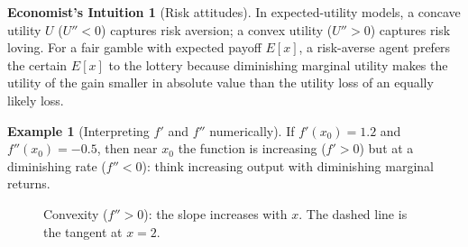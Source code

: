 \documentclass[12pt]{article}
\theoremstyle{definition}
\newtheorem{example}{Example}
\newtheorem{remark}{Economist's Intuition}
\begin{document}
\begin{remark}[Risk attitudes]
In expected-utility models, a concave utility $U$ ($U''<0$) captures risk aversion; a convex utility ($U''>0$) captures risk loving. For a fair gamble with expected payoff $E[x]$, a risk-averse agent prefers the certain $E[x]$ to the lottery because diminishing marginal utility makes the utility of the gain smaller in absolute value than the utility loss of an equally likely loss.
\end{remark}

\begin{example}[Interpreting $f'$ and $f''$ numerically]
If $f'(x_0)=1.2$ and $f''(x_0)=-0.5$, then near $x_0$ the function is increasing ($f'>0$) but at a diminishing rate ($f''<0$): think increasing output with diminishing marginal returns.
\end{example}






\begin{figure}[ht]
\centering
{}
\caption{Convexity ($f''>0$): the slope increases with $x$. The dashed line is the tangent at $x=2$.}
\end{figure}
\end{document}
